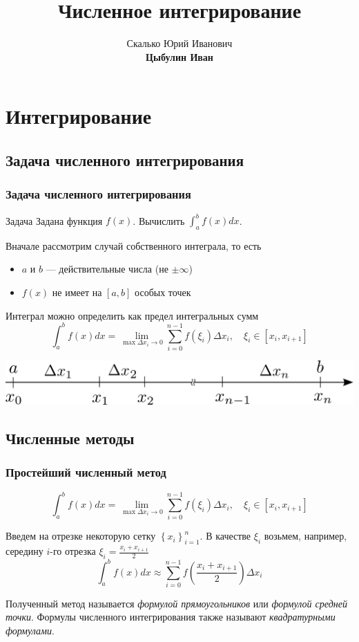 \documentclass[aspectratio=169,unicode]{beamer}
\title[Интегрирование]{Численное интегрирование}
\author[Цыбулин Иван]{Скалько Юрий Иванович\\
\textbf{Цыбулин Иван}}
\date{}
\begin{document}
\begin{frame}[plain]
\titlepage
\end{frame}

\section{Интегрирование}
\subsection{Задача численного интегрирования}
\begin{frame}
\frametitle{Задача численного интегрирования}
	\begin{block}{Задача}
		Задана функция $f(x)$. Вычислить $\displaystyle\int_a^b f(x) dx$.
	\end{block}
	\pause

	Вначале рассмотрим случай собственного интеграла, то есть
	\begin{itemize}
		\item $a$ и $b$ --- действительные числа (не $\pm \infty$)
		\item $f(x)$ не имеет на $[a,b]$ особых точек
	\end{itemize}
	\pause

	Интеграл можно определить как предел интегральных сумм
	\[
	\int_a^b f(x) dx = \lim_{\max \Delta x_i \rightarrow 0} \sum_{i=0}^{n-1}
f(\xi_i) \Delta x_i,\quad \xi_i \in [x_i,x_{i+1}]
	\]

	\begin{center}
	\includegraphics[height=.15\textheight]{grid.png}
	\end{center}
\end{frame}

\subsection{Численные методы}
\begin{frame}
\frametitle{Простейший численный метод}
	\[
	\int_a^b f(x) dx = \lim_{\max \Delta x_i \rightarrow 0} \sum_{i=0}^{n-1} f(\xi_i) \Delta x_i,\quad \xi_i \in [x_i,x_{i+1}]
	\]

	Введем на отрезке некоторую сетку $\left\{x_i\right\}_{i = 1}^n$. В качестве $\xi_i$ возьмем, например, середину $i$-го отрезка
	$ \xi_i = \frac{x_i+x_{i+1}}{2} $
	\pause
	\[
	\int_a^b f(x) dx \approx \sum_{i=0}^{n-1} f\left(\frac{x_i+x_{i+1}}{2}\right)\Delta x_i
	\]
	\pause

	Полученный метод называется \emph{формулой прямоугольников} или
	\emph{формулой средней точки}. Формулы численного интегрирования также
	называют \emph{квадратурными формулами}.
\end{frame}
\end{document}
